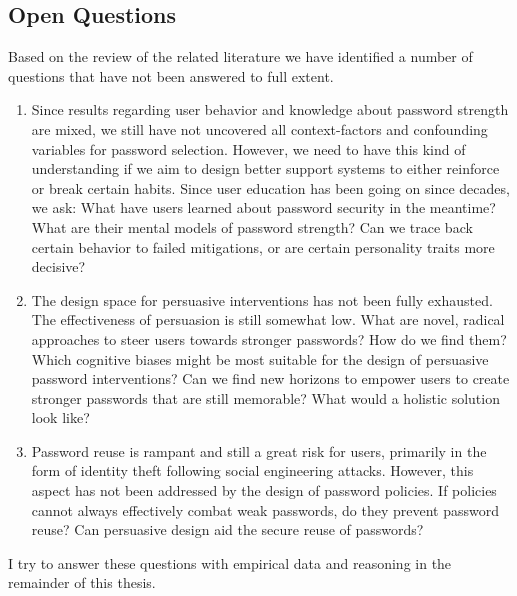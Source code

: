\subsection*{Open Questions}
Based on the review of the related literature we have identified a number of questions that have not been answered to full extent. 
\begin{enumerate}
	\item Since results regarding user behavior and knowledge about password strength are mixed, we still have not uncovered all context-factors and confounding variables for password selection. However, we need to have this kind of understanding if we aim to design better support systems to either reinforce or break certain habits. Since user education has been going on since decades, we ask: What have users learned about password security in the meantime? What are their mental models of password strength? Can we trace back certain behavior to failed mitigations, or are certain personality traits more decisive?
	
	\item The design space for persuasive interventions has not been fully exhausted. The effectiveness of persuasion is still somewhat low. What are novel, radical approaches to steer users towards stronger passwords? How do we find them? Which cognitive biases might be most suitable for the design of persuasive password interventions? Can we find new horizons to empower users to create stronger passwords that are still memorable? What would a holistic solution look like?
	
	\item Password reuse is rampant and still a great risk for users, primarily in the form of identity theft following social engineering attacks. However, this aspect has not been addressed by the design of password policies. If policies cannot always effectively combat weak passwords, do they prevent password reuse? Can persuasive design aid the secure reuse of passwords?
\end{enumerate}

I try to answer these questions with empirical data and reasoning in the remainder of this thesis.


